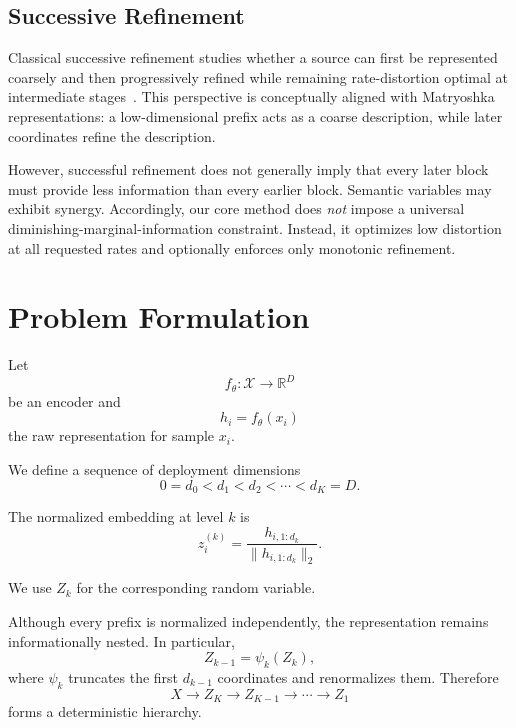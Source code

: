 \documentclass[11pt]{article}
\newcommand{\R}{\mathbb{R}}
\begin{document}
\subsection{Successive Refinement}

Classical successive refinement studies whether a source can first be represented coarsely and then progressively refined while remaining rate-distortion optimal at intermediate stages~\cite{equitz1991successive}.
This perspective is conceptually aligned with Matryoshka representations:
a low-dimensional prefix acts as a coarse description, while later coordinates refine the description.

However, successful refinement does not generally imply that every later block must provide less information than every earlier block.
Semantic variables may exhibit synergy.
Accordingly, our core method does \emph{not} impose a universal diminishing-marginal-information constraint.
Instead, it optimizes low distortion at all requested rates and optionally enforces only monotonic refinement.


\section{Problem Formulation}

Let
\begin{equation}
    f_\theta:\mathcal{X}\rightarrow\R^D
\end{equation}
be an encoder and
\begin{equation}
    h_i = f_\theta(x_i)
\end{equation}
the raw representation for sample $x_i$.

We define a sequence of deployment dimensions
\begin{equation}
    0=d_0 < d_1 < d_2 < \cdots < d_K=D.
\end{equation}

The normalized embedding at level $k$ is
\begin{equation}
    z_i^{(k)}
    =
    \frac{
        h_{i,1:d_k}
    }{
        \|h_{i,1:d_k}\|_2
    }.
    \label{eq:prefix}
\end{equation}

We use $Z_k$ for the corresponding random variable.

Although every prefix is normalized independently, the representation remains informationally nested.
In particular,
\begin{equation}
    Z_{k-1}=\psi_k(Z_k),
\end{equation}
where $\psi_k$ truncates the first $d_{k-1}$ coordinates and renormalizes them.
Therefore
\begin{equation}
    X \rightarrow Z_K \rightarrow Z_{K-1}
    \rightarrow \cdots \rightarrow Z_1
\end{equation}
forms a deterministic hierarchy.
\end{document}
